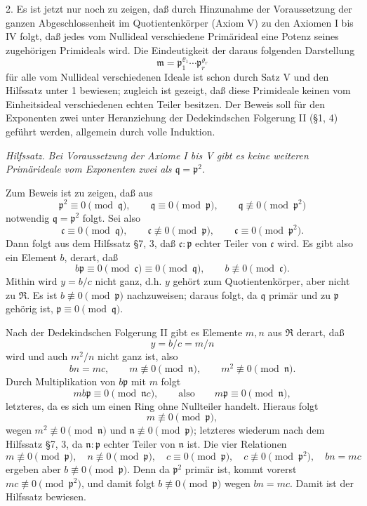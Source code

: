 \documentclass[11pt]{article}
\providecommand{\mR}{\mathfrak{R}}
\providecommand{\mc}{\mathfrak{c}}
\providecommand{\mm}{\mathfrak{m}}
\providecommand{\mn}{\mathfrak{n}}
\providecommand{\mpideal}{\mathfrak{p}}
\providecommand{\mq}{\mathfrak{q}}
\begin{document}
2. Es ist jetzt nur noch zu zeigen, daß durch Hinzunahme der Voraussetzung der ganzen Abgeschlossenheit im Quotientenkörper (Axiom V) zu den Axiomen I bis IV folgt, daß jedes vom Nullideal verschiedene Primärideal eine Potenz seines zugehörigen Primideals wird. Die Eindeutigkeit der daraus folgenden Darstellung
\[
        \mm=\mpideal_1^{\varrho_1}\cdots\mpideal_r^{\varrho_r}
\]
für alle vom Nullideal verschiedenen Ideale ist schon durch Satz V und den Hilfssatz unter 1 bewiesen; zugleich ist gezeigt, daß diese Primideale keinen vom Einheitsideal verschiedenen echten Teiler besitzen. Der Beweis soll für den Exponenten zwei unter Heranziehung der Dedekindschen Folgerung II (§1, 4) geführt werden, allgemein durch volle Induktion.

\emph{Hilfssatz.} \emph{Bei Voraussetzung der Axiome I bis V gibt es keine weiteren Primärideale vom Exponenten zwei als $\mq=\mpideal^2$.}

Zum Beweis ist zu zeigen, daß aus
\[
        \mpideal^2\equiv0\pmod{\mq},
        \qquad \mq\equiv0\pmod{\mpideal},
        \qquad \mq\not\equiv0\pmod{\mpideal^2}
\]
notwendig $\mq=\mpideal^2$ folgt. Sei also
\[
        \mc\equiv0\pmod{\mq},
        \qquad \mc\not\equiv0\pmod{\mpideal},
        \qquad \mc\equiv0\pmod{\mpideal^2}.
\]
Dann folgt aus dem Hilfssatz §7, 3, daß $\mc:\mpideal$ echter Teiler von $\mc$ wird. Es gibt also ein Element $b$, derart, daß
\[
        b\mpideal\equiv0\pmod{\mc}\equiv0\pmod{\mq},
        \qquad b\not\equiv0\pmod{\mc}.
\]
Mithin wird $y=b/c$ nicht ganz, d.h. $y$ gehört zum Quotientenkörper, aber nicht zu $\mR$. Es ist $b\not\equiv0\pmod{\mpideal}$ nachzuweisen; daraus folgt, da $\mq$ primär und zu $\mpideal$ gehörig ist, $\mpideal\equiv0\pmod{\mq}$.

Nach der Dedekindschen Folgerung II gibt es Elemente $m,n$ aus $\mR$ derart, daß
\[
        y=b/c=m/n
\]
wird und auch $m^2/n$ nicht ganz ist, also
\[
        bn=mc,
        \qquad m\not\equiv0\pmod{\mn},
        \qquad m^2\not\equiv0\pmod{\mn}.
\]
Durch Multiplikation von $b\mpideal$ mit $m$ folgt
\[
        mb\mpideal\equiv0\pmod{\mn c},
        \qquad\text{also}\qquad m\mpideal\equiv0\pmod{\mn},
\]
letzteres, da es sich um einen Ring ohne Nullteiler handelt. Hieraus folgt
\[
        m\not\equiv0\pmod{\mpideal},
\]
wegen $m^2\not\equiv0\pmod{\mn}$ und $\mn\not\equiv0\pmod{\mpideal}$; letzteres wiederum nach dem Hilfssatz §7, 3, da $\mn:\mpideal$ echter Teiler von $\mn$ ist. Die vier Relationen
\[
        m\not\equiv0\pmod{\mpideal},
        \quad n\not\equiv0\pmod{\mpideal},
        \quad c\equiv0\pmod{\mpideal},
        \quad c\not\equiv0\pmod{\mpideal^2},
        \quad bn=mc
\]
ergeben aber $b\not\equiv0\pmod{\mpideal}$. Denn da $\mpideal^2$ primär ist, kommt vorerst $mc\not\equiv0\pmod{\mpideal^2}$, und damit folgt $b\not\equiv0\pmod{\mpideal}$ wegen $bn=mc$. Damit ist der Hilfssatz bewiesen.
\end{document}
